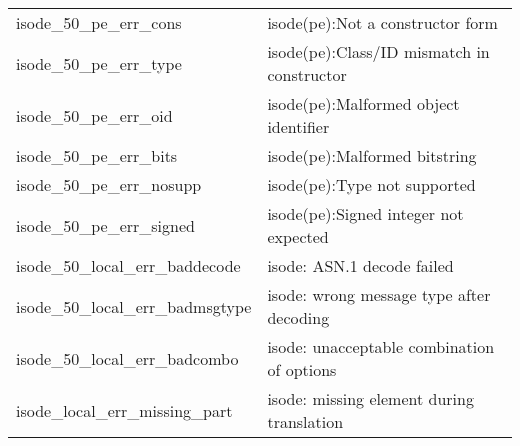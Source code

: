 \begin{small}
\begin{tabular}{ll}
{\sc isode_50_pe_err_cons}& isode(pe):Not a constructor form \\
{\sc isode_50_pe_err_type}& isode(pe):Class/ID mismatch in constructor \\
{\sc isode_50_pe_err_oid}& isode(pe):Malformed object identifier \\
{\sc isode_50_pe_err_bits}& isode(pe):Malformed bitstring \\
{\sc isode_50_pe_err_nosupp}& isode(pe):Type not supported \\
{\sc isode_50_pe_err_signed}& isode(pe):Signed integer not expected \\
{\sc isode_50_local_err_baddecode}&	isode: ASN.1 decode failed \\
{\sc isode_50_local_err_badmsgtype}&	isode: wrong message type after decoding \\
{\sc isode_50_local_err_badcombo}&	isode: unacceptable combination of options \\
{\sc isode_local_err_missing_part}&	isode: missing element during translation \\
\end{tabular}
\end{small}
